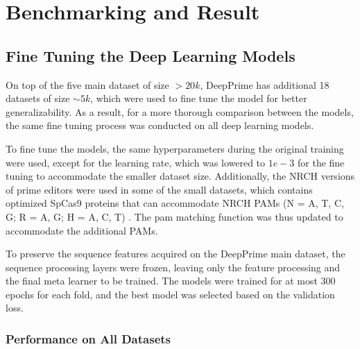 \chapter{Benchmarking and Result}

\section{Fine Tuning the Deep Learning Models}

On top of the five main dataset of size $> 20k$, DeepPrime has additional 18 datasets of size $\sim5k$, which were used to fine tune the model for better generalizability. As a result, for a more thorough comparison between the models, the same fine tuning process was conducted on all deep learning models.

To fine tune the models, the same hyperparameters during the original training were used, except for the learning rate, which was lowered to $1e-3$ for the fine tuning to accommodate the smaller dataset size. Additionally, the NRCH versions of prime editors were used in some of the small datasets, which contains optimized SpCas9 proteins that can accommodate NRCH PAMs (N = A, T, C, G; R = A, G; H = A, C, T) \cite{millerContinuousEvolutionSpCas92020}. The pam matching function was thus updated to accommodate the additional PAMs.

To preserve the sequence features acquired on the DeepPrime main dataset, the sequence processing layers were frozen, leaving only the feature processing and the final meta learner to be trained. The models were trained for at most 300 epochs for each fold, and the best model was selected based on the validation loss.


\subsection{Performance on All Datasets}

